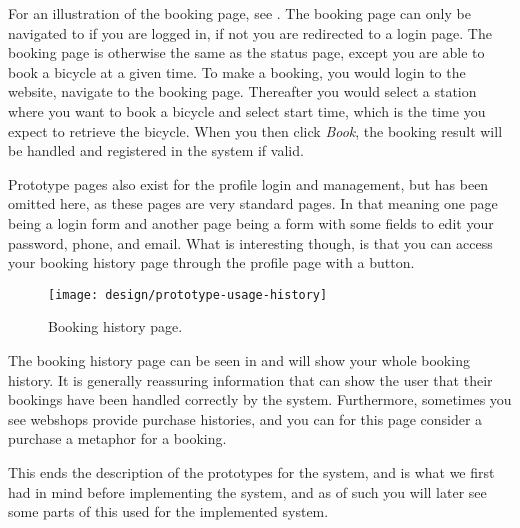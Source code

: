 For an illustration of the booking page, see .
The booking page can only be navigated to if you are logged in, if not you are redirected to a login page.
The booking page is otherwise the same as the status page, except you are able to book a bicycle at a given time.
To make a booking, you would login to the website, navigate to the booking page.
Thereafter you would select a station where you want to book a bicycle and select start time, which is the time you expect to retrieve the bicycle.
When you then click \textit{Book}, the booking result will be handled and registered in the system if valid.

Prototype pages also exist for the profile login and management, but has been omitted here, as these pages are very standard pages.
In that meaning one page being a login form and another page being a form with some fields to edit your password, phone, and email.
What is interesting though, is that you can access your booking history page through the profile page with a button.

\begin{figure}[h]
	\centering
	\texttt{[image: design/prototype-usage-history]}
	\caption{Booking history page.}\label{fig:prototype-usage-history}
\end{figure}

The booking history page can be seen in  and will show your whole booking history.
It is generally reassuring information that can show the user that their bookings have been handled correctly by the system.
Furthermore, sometimes you see webshops provide purchase histories, and you can for this page consider a purchase a metaphor for a booking.

This ends the description of the prototypes for the system, and is what we first had in mind before implementing the system, and as of such you will later see some parts of this used for the implemented system.